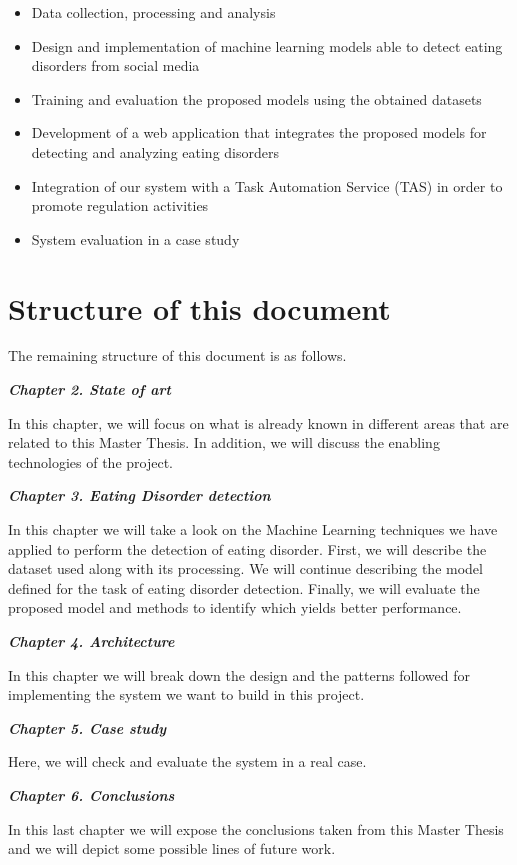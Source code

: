 \begin{itemize}
    \item Data collection, processing and analysis
    \item Design and implementation of machine learning models able to detect eating disorders from social media
    \item Training and evaluation the proposed models using the obtained datasets
    \item Development of a web application that integrates the proposed models for detecting and analyzing eating disorders
    \item Integration of our system with a Task Automation Service (TAS) in order  to promote regulation activities
    \item System evaluation in a case study
\end{itemize}

\section{Structure of this document}

The remaining structure of this document is as follows.

\textbf{\textit{Chapter 2. State of art}}

In this chapter, we will focus on what is already known in different areas that are related to this Master Thesis. In addition, we will discuss the enabling technologies of
the project.

\textbf{\textit{Chapter 3. Eating Disorder detection}} 

In this chapter we will take a look on the Machine Learning techniques  we have applied to perform the detection of eating disorder. First, we will describe the dataset used along with its processing. We will continue describing the model defined for the task of eating disorder detection. Finally, we will evaluate the proposed model and methods to identify which yields better performance.

\textbf{\textit{Chapter 4. Architecture}} 

In this chapter we will break down the design and the patterns followed for implementing the system we want to build in this project.

\textbf{\textit{Chapter 5. Case study}}

Here, we will check and evaluate the system in a real case.

\textbf{\textit{Chapter 6. Conclusions}} 

In this last chapter we will expose the conclusions taken from this Master Thesis and we will depict some possible lines of future work.
